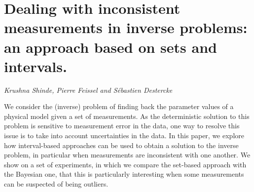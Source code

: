 \documentclass[../booklet.tex]{subfiles}
\begin{document}
\section[Dealing with inconsistent measurements in inverse problems: an approach based on sets and intervals.. {\it Krushna Shinde, Pierre Feissel and Sébastien Destercke}]{Dealing with inconsistent measurements in inverse problems: an approach based on sets and intervals.}
  

\begin{center}
  {\it Krushna Shinde, Pierre Feissel and Sébastien Destercke}
\end{center}

\vskip 0.8cm


We consider the (inverse) problem of finding back the parameter values of a physical model given a set of measurements. As the deterministic solution to this problem is sensitive to measurement error in the data, one way to resolve this issue is to take into account uncertainties in the data. In this paper, we explore how interval-based approaches can be used to obtain a solution to the inverse problem, in particular when measurements are inconsistent with one another. We show on a set of experiments, in which we compare the set-based approach with the Bayesian one, that this is particularly interesting when some measurements can be suspected of being outliers.  
\end{document}
